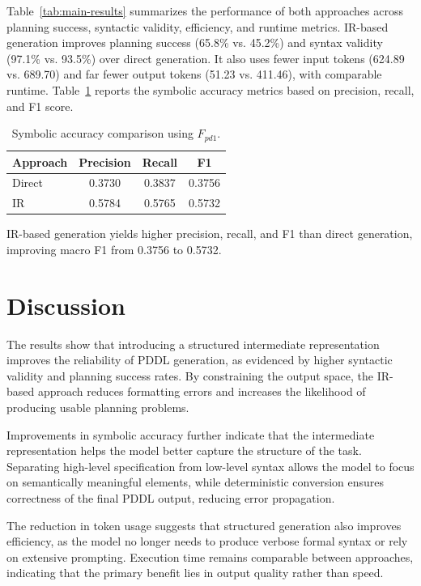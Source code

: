 \documentclass[acmlarge]{acmart}
\begin{document}
Table~\ref{tab:main-results} summarizes the performance of both approaches across planning success, syntactic validity, efficiency, and runtime metrics. IR-based generation improves planning success (65.8\% vs. 45.2\%) and syntax validity (97.1\% vs. 93.5\%) over direct generation. It also uses fewer input tokens (624.89 vs. 689.70) and far fewer output tokens (51.23 vs. 411.46), with comparable runtime. Table~\ref{tab:f1-results} reports the symbolic accuracy metrics based on precision, recall, and F1 score.

\begin{table}[h]
\centering
\caption{Symbolic accuracy comparison using $F_{pd1}$.}
\label{tab:f1-results}
\begin{tabular}{lccc}
\toprule
\textbf{Approach} & \textbf{Precision} & \textbf{Recall} & \textbf{F1} \\
\midrule
Direct  & 0.3730 & 0.3837 & 0.3756 \\
IR & 0.5784 & 0.5765 & 0.5732 \\
\bottomrule
\end{tabular}
\end{table}

IR-based generation yields higher precision, recall, and F1 than direct generation, improving macro F1 from 0.3756 to 0.5732.

\section{Discussion}
\label{sec:discussion}

The results show that introducing a structured intermediate representation improves the reliability of PDDL generation, as evidenced by higher syntactic validity and planning success rates. By constraining the output space, the IR-based approach reduces formatting errors and increases the likelihood of producing usable planning problems.

Improvements in symbolic accuracy further indicate that the intermediate representation helps the model better capture the structure of the task. Separating high-level specification from low-level syntax allows the model to focus on semantically meaningful elements, while deterministic conversion ensures correctness of the final PDDL output, reducing error propagation.

The reduction in token usage suggests that structured generation also improves efficiency, as the model no longer needs to produce verbose formal syntax or rely on extensive prompting. Execution time remains comparable between approaches, indicating that the primary benefit lies in output quality rather than speed.
\end{document}
